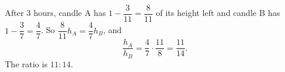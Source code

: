 After $3$ hours, candle A has $1-\dfrac3{11}=\dfrac8{11}$ of its height left and candle B has $1-\dfrac37=\dfrac47$. So $\dfrac8{11}h_A=\dfrac47h_B$, and
\[\dfrac{h_A}{h_B}=\dfrac{4}{7}\cdot\dfrac{11}{8}=\dfrac{11}{14}.\]
The ratio is $\boxed{11:14}$.
